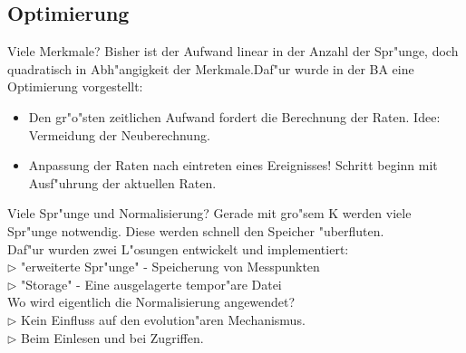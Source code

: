 \documentclass{beamer}
\begin{document}
\subsection{Optimierung}
\begin{frame}{Viele Merkmale?}
Bisher ist der Aufwand linear in der Anzahl der Spr"unge, doch quadratisch in Abh"angigkeit der Merkmale.\pause Daf"ur wurde in der BA eine Optimierung vorgestellt:
	\begin{itemize}
		\item Den gr"o"sten zeitlichen Aufwand fordert die Berechnung der Raten. Idee: Vermeidung der Neuberechnung.\pause
		\item Anpassung der Raten nach eintreten eines Ereignisses! Schritt beginn mit Ausf"uhrung der aktuellen Raten.
	\end{itemize}
\end{frame}

\begin{frame}{Viele Spr"unge und Normalisierung?}
Gerade mit gro"sem K werden viele Spr"unge notwendig. Diese werden schnell den Speicher "uberfluten.\pause\bigskip\\
Daf"ur wurden zwei L"osungen entwickelt und implementiert:\\
$ \rhd $ "{}erweiterte Spr"unge"{} - Speicherung von Messpunkten\\
$ \rhd $ "{}Storage"{} - Eine ausgelagerte tempor"are Datei\bigskip\\\pause
Wo wird eigentlich die Normalisierung angewendet?\\\pause
$ \rhd $ Kein Einfluss auf den evolution"aren Mechanismus.\\
$ \rhd $ Beim Einlesen und bei Zugriffen.\\
\end{frame}
\end{document}

